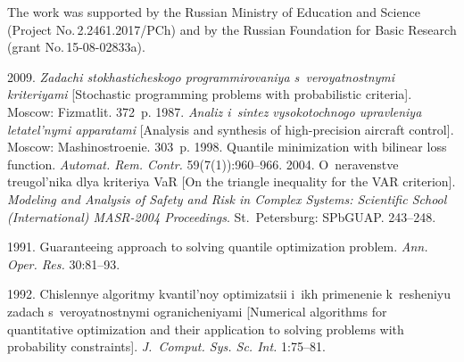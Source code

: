 

\Ack
\noindent
The work was supported by the Russian Ministry of Education and Science (Project 
No.\,2.2461.2017/PCh) and by the Russian Foundation for Basic Research (grant 
No.\,15-08-02833a).

\pagebreak




  \begin{multicols}{2}

\renewcommand{\bibname}{\protect\rmfamily References}

{\small\frenchspacing
 {%
 \begin{thebibliography}{99}

 2009. 
\textit{Zadachi sto\-kha\-sti\-che\-skogo programmirovaniya 
s~veroyatnostnymi kriteriyami}  
[Stochastic programming problems with probabilistic criteria]. Moscow: Fizmatlit.  372~p.
 1987. 
\textit{Analiz i~sintez vysokotochnogo upravleniya 
letatel'nymi apparatami}  [Analysis and synthesis of high-precision aircraft control].
 Moscow: Mashinostroenie.  303~p.
 1998. 
Quantile minimization with bilinear loss function.
\textit{Automat.  Rem. Contr.} 59(7(1)):960--966.
 2004.  
O~neravenstve treugol'nika  dlya kriteriya 
VaR [On the triangle inequality for the VAR criterion].
\textit{Modeling and Analysis of Safety and Risk in Complex Systems: Scientific 
 School (International) MASR-2004 Proceedings}. St.\ Petersburg:
SPbGUAP. 243--248.

 1991. 
Guaranteeing approach to solving quantile optimization problem.
\textit{Ann. Oper. Res.} 30:81--93.

 1992.
 Chislennye algoritmy kvantil'noy optimizatsii i~ikh primenenie k~re\-she\-niyu zadach 
 s~veroyatnostnymi ogranicheniyami [Numerical algorithms for quantitative 
 optimization and their application to solving problems with probability constraints].
 \textit{J.~Comput. Sys. Sc. Int.}  1:75--81.
 

\end{thebibliography}}}
\end{multicols}

